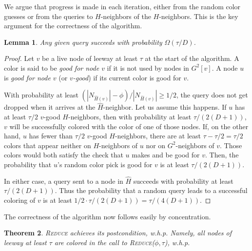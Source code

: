 \documentclass[12pt,a4]{article}
\newtheorem{theorem}{Theorem}[section]
\newtheorem{lemma}[theorem]{Lemma}
\newcommand{\alg}[1]{\textsc{#1}}
\begin{document}
We argue that progress is made in each iteration, either from the random color guesses or from the queries to $H$-neighbors of the $H$-neighbors. This is the key argument for the correctness of the algorithm.

\begin{lemma}
Any given query succeeds with probability $\Omega(\tau/D)$.
\label{L:progress}
\end{lemma}

\begin{proof}
Let $v$ be a live node of leeway at least $\tau$ at the start of the algorithm. 
A color is said to be \emph{good for node $v$} if it is not used by nodes in $G^2[v]$.
A node $u$ is \emph{good for node $v$} (or \emph{$v$-good}) if its current color is good for $v$.

With probability at least $(|N_{\hat{H}(v)}|-\phi)/|N_{\hat{H}(v)}|  \ge 1/2$, the query does not get dropped when it arrives at the $\hat{H}$-neighbor. Let us assume this happens.
If $u$ has at least $\tau/2$ $v$-good $H$-neighbors, then with probability at least $\tau / (2(D+1))$, $v$ will be successfully colored with the color of one of those nodes.
If, on the other hand, $u$ has fewer than $\tau/2$ $v$-good $H$-neighbors, there are at least $\tau - \tau/2 = \tau/2$ colors that appear neither on $H$-neighbors of $u$ nor on $G^2$-neighbors of $v$. Those colors would both satisfy the check that $u$ makes and be good for $v$. 
Then, the probability that $u$'s random color pick is good for $v$ is at least $\tau/(2(D+1))$. 

In either case, a query sent to a node in $\hat{H}$ succeeds with probability at least $\tau/(2(D+1))$.
Thus the probability that a random query leads to a successful coloring of $v$ is at least $1/2 \cdot \tau/(2(D+1)) = \tau/(4(D+1))$.
\end{proof}

The correctness of the algorithm now follows easily by concentration.
\begin{theorem}
\alg{Reduce} achieves its postcondition, w.h.p. Namely, all nodes of leeway at least $\tau$ are colored in the call to \alg{Reduce}($\phi,\tau$), w.h.p.
\end{theorem}
\end{document}
